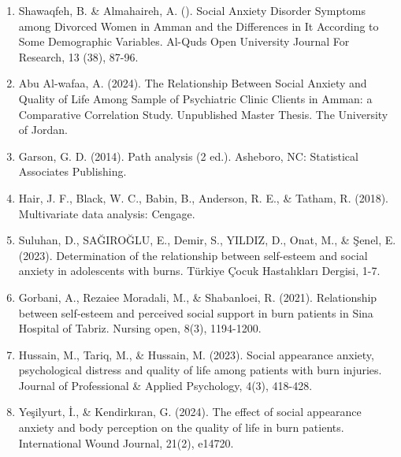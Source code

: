 \documentclass[10pt]{NSP1}
\begin{document}
\begin{enumerate}
  \item Shawaqfeh, B. \& Almahaireh, A. (). Social Anxiety Disorder Symptoms among Divorced Women in Amman and the Differences in It According to Some Demographic Variables. Al-Quds Open University Journal For Research, 13 (38), 87-96.
  \item Abu Al-wafaa, A. (2024). The Relationship Between Social Anxiety and Quality of Life Among Sample of Psychiatric Clinic Clients in Amman: a Comparative Correlation Study. Unpublished Master Thesis. The University of Jordan.
  \item Garson, G. D. (2014). Path analysis (2 ed.). Asheboro, NC: Statistical Associates Publishing.
  \item Hair, J. F., Black, W. C., Babin, B., Anderson, R. E., \& Tatham, R. (2018). Multivariate data analysis: Cengage.
  \item Suluhan, D., SAĞIROĞLU, E., Demir, S., YILDIZ, D., Onat, M., \& Şenel, E. (2023). Determination of the relationship between self-esteem and social anxiety in adolescents with burns. Türkiye Çocuk Hastalıkları Dergisi, 1-7.
  \item Gorbani, A., Rezaiee Moradali, M., \& Shabanloei, R. (2021). Relationship between self‐esteem and perceived social support in burn patients in Sina Hospital of Tabriz. Nursing open, 8(3), 1194-1200.
  \item Hussain, M., Tariq, M., \& Hussain, M. (2023). Social appearance anxiety, psychological distress and quality of life among patients with burn injuries. Journal of Professional \& Applied Psychology, 4(3), 418-428.
  \item Yeşilyurt, İ., \& Kendirkıran, G. (2024). The effect of social appearance anxiety and body perception on the quality of life in burn patients. International Wound Journal, 21(2), e14720.
\end{enumerate}
\end{document}

